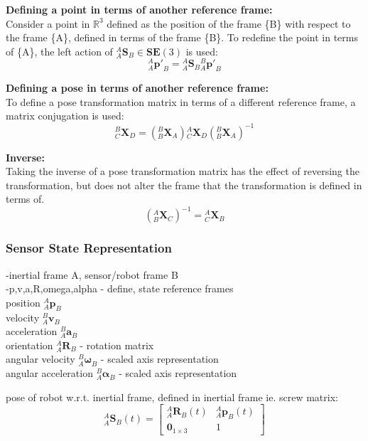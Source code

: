 		\textbf{Defining a point in terms of another reference frame:}\\
		Consider a point in $\mathbb{R}^3$ defined as the position of the frame \{B\} with respect to the frame \{A\}, defined in terms of the frame \{B\}. To redefine the point in terms of \{A\}, the left action of ${^{A}_{A}\mathbf{S}^{}_{B}} \in \mathbf{SE}(3)$ is used:
		\begin{equation}
			{^{A}_{A}\mathbf{p'}^{}_{B}} = {^{A}_{A}\mathbf{S}^{}_{B}}{^{B}_{A}\mathbf{p'}^{}_{B}}
		\end{equation}
		
		\textbf{Defining a pose in terms of another reference frame:}\\
		To define a pose transformation matrix in terms of a different reference frame, a matrix conjugation is used:
		\begin{equation}
			{^{B}_{C}\mathbf{X}^{}_{D}} = ({^{B}_{B}\mathbf{X}^{}_{A}}){^{A}_{C}\mathbf{X}^{}_{D}}({^{B}_{B}\mathbf{X}^{}_{A}})^{-1}
		\end{equation}

		\textbf{Inverse:}\\
		Taking the inverse of a pose transformation matrix has the effect of reversing the transformation, but does not alter the frame that the transformation is defined in terms of.
		\begin{equation}
			({^{A}_{B}\mathbf{X}^{}_{C}})^{-1} = {^{A}_{C}\mathbf{X}^{}_{B}}
		\end{equation}
	
	\subsubsection{Sensor State Representation}
		-inertial frame A, sensor/robot frame  B\\
		-p,v,a,R,omega,alpha - define, state reference frames\\	
		position $^{A}_{A}\mathbf{p}^{}_{B}$\\
		velocity $^{B}_{A}\mathbf{v}^{}_{B}$\\
		acceleration $^{B}_{A}\mathbf{a}^{}_{B}$\\
		orientation $^{A}_{A}\mathbf{R}^{}_{B}$ - rotation matrix\\
		angular velocity $^{B}_{A}\mathbf{\omega}^{}_{B}$ - scaled axis representation\\
		angular acceleration $^{B}_{A}\mathbf{\alpha}^{}_{B}$ - scaled axis representation
		
		pose of robot w.r.t. inertial frame, defined in inertial frame ie. screw matrix:
		\begin{equation}
				{^{A}_{A}\mathbf{S}^{}_{B}(t)} = 
				\begin{bmatrix}
						  ^{A}_{A}\mathbf{R}^{}_{B}(t) 	& 	^{A}_{A}\mathbf{p}^{}_{B}(t)\\
						  \textbf{0}_{1 \times 3} & 1						  
				\end{bmatrix}
		\end{equation}
		
